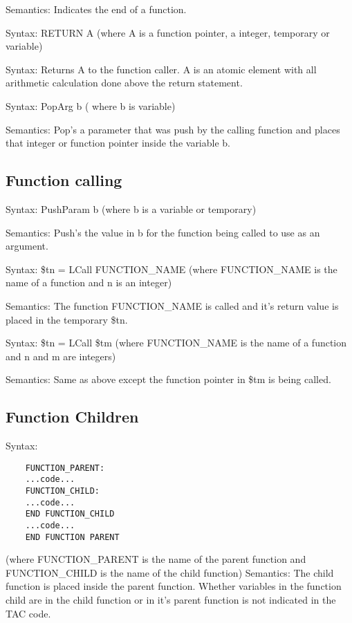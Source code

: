 \documentclass{article}
\begin{document}
	Semantics: Indicates the end of a function.
	
	Syntax: RETURN A (where A is a function pointer, a integer, temporary or variable) 
	
	Syntax: Returns A to the function caller. A is an atomic element with all arithmetic calculation done above the return statement.
	
	Syntax: PopArg b ( where b is variable)
	
	Semantics: Pop's a parameter that was push by the calling function and places that integer or function pointer inside the variable b.
	
	\subsection{Function calling}
	
	Syntax: PushParam b (where b is a variable or temporary)
	
	Semantics: Push's the value in b for the function being called to use as an argument.
	
	Syntax: \$tn = LCall FUNCTION\_NAME (where FUNCTION\_NAME is the name of a function and n is an integer)
	
	Semantics: The function FUNCTION\_NAME is called and it's return value is placed in the temporary \$tn. 
	
	Syntax: \$tn = LCall \$tm (where FUNCTION\_NAME is the name of a function and  n and m are integers)
	
	Semantics: Same as above except the function pointer in \$tm is being called.
	
	\subsection{Function Children}
	
	Syntax: 
	
	\begin{lstlisting}
	FUNCTION_PARENT:
	...code...
	FUNCTION_CHILD:
	...code...
	END FUNCTION_CHILD
	...code...
	END FUNCTION PARENT 
	\end{lstlisting}

	(where FUNCTION\_PARENT is the name of the parent function and FUNCTION\_CHILD is the name of the child function)
	\newline
	Semantics: The child function is placed inside the parent function. Whether variables in the function child are in the child function or in it's parent function is not indicated in the TAC code. 
	
\end{document}
